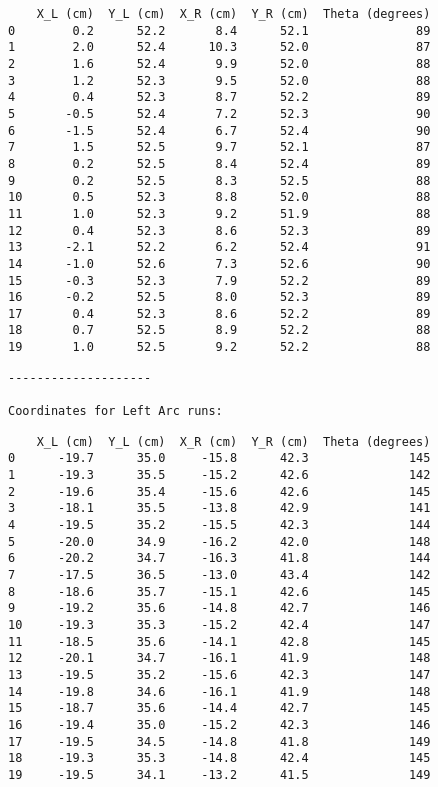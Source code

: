 \documentclass[11pt]{article}
\begin{document}
    
    \begin{verbatim}
    X_L (cm)  Y_L (cm)  X_R (cm)  Y_R (cm)  Theta (degrees)
0        0.2      52.2       8.4      52.1               89
1        2.0      52.4      10.3      52.0               87
2        1.6      52.4       9.9      52.0               88
3        1.2      52.3       9.5      52.0               88
4        0.4      52.3       8.7      52.2               89
5       -0.5      52.4       7.2      52.3               90
6       -1.5      52.4       6.7      52.4               90
7        1.5      52.5       9.7      52.1               87
8        0.2      52.5       8.4      52.4               89
9        0.2      52.5       8.3      52.5               88
10       0.5      52.3       8.8      52.0               88
11       1.0      52.3       9.2      51.9               88
12       0.4      52.3       8.6      52.3               89
13      -2.1      52.2       6.2      52.4               91
14      -1.0      52.6       7.3      52.6               90
15      -0.3      52.3       7.9      52.2               89
16      -0.2      52.5       8.0      52.3               89
17       0.4      52.3       8.6      52.2               89
18       0.7      52.5       8.9      52.2               88
19       1.0      52.5       9.2      52.2               88
    \end{verbatim}

    
    \begin{Verbatim}[commandchars=\\\{\}]
--------------------

Coordinates for Left Arc runs:

    \end{Verbatim}

    
    \begin{verbatim}
    X_L (cm)  Y_L (cm)  X_R (cm)  Y_R (cm)  Theta (degrees)
0      -19.7      35.0     -15.8      42.3              145
1      -19.3      35.5     -15.2      42.6              142
2      -19.6      35.4     -15.6      42.6              145
3      -18.1      35.5     -13.8      42.9              141
4      -19.5      35.2     -15.5      42.3              144
5      -20.0      34.9     -16.2      42.0              148
6      -20.2      34.7     -16.3      41.8              144
7      -17.5      36.5     -13.0      43.4              142
8      -18.6      35.7     -15.1      42.6              145
9      -19.2      35.6     -14.8      42.7              146
10     -19.3      35.3     -15.2      42.4              147
11     -18.5      35.6     -14.1      42.8              145
12     -20.1      34.7     -16.1      41.9              148
13     -19.5      35.2     -15.6      42.3              147
14     -19.8      34.6     -16.1      41.9              148
15     -18.7      35.6     -14.4      42.7              145
16     -19.4      35.0     -15.2      42.3              146
17     -19.5      34.5     -14.8      41.8              149
18     -19.3      35.3     -14.8      42.4              145
19     -19.5      34.1     -13.2      41.5              149
    \end{verbatim}
\end{document}
